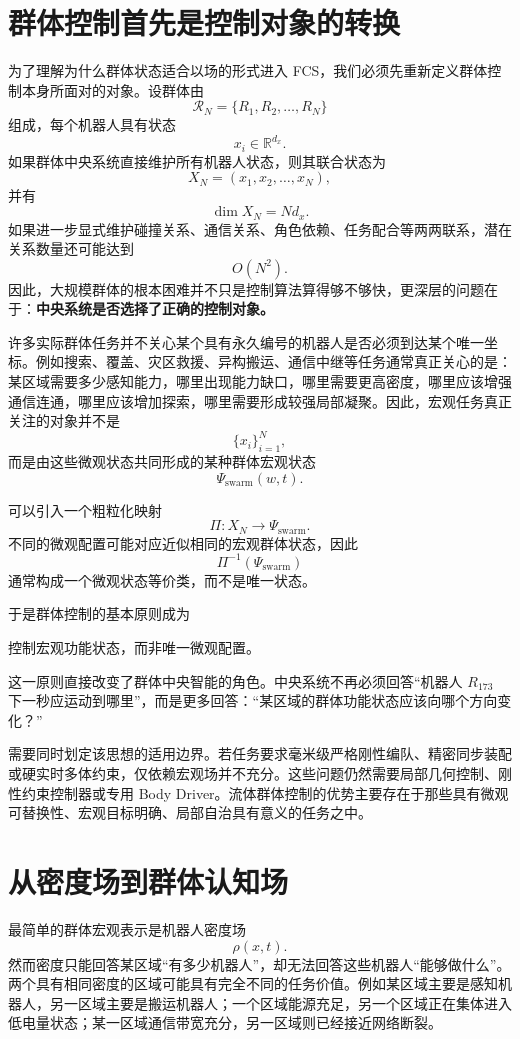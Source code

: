 \section{群体控制首先是控制对象的转换}

为了理解为什么群体状态适合以场的形式进入 FCS，我们必须先重新定义群体控制本身所面对的对象。设群体由
\[
\mathcal R_N
=
\{R_1,R_2,\ldots,R_N\}
\]
组成，每个机器人具有状态
\[
x_i\in\mathbb R^{d_x}.
\]
如果群体中央系统直接维护所有机器人状态，则其联合状态为
\[
X_N
=
(x_1,x_2,\ldots,x_N),
\]
并有
\[
\dim X_N
=
Nd_x.
\]
如果进一步显式维护碰撞关系、通信关系、角色依赖、任务配合等两两联系，潜在关系数量还可能达到
\[
O(N^2).
\]
因此，大规模群体的根本困难并不只是控制算法算得够不够快，更深层的问题在于：\textbf{中央系统是否选择了正确的控制对象。}

许多实际群体任务并不关心某个具有永久编号的机器人是否必须到达某个唯一坐标。例如搜索、覆盖、灾区救援、异构搬运、通信中继等任务通常真正关心的是：某区域需要多少感知能力，哪里出现能力缺口，哪里需要更高密度，哪里应该增强通信连通，哪里应该增加探索，哪里需要形成较强局部凝聚。因此，宏观任务真正关注的对象并不是
\[
\{x_i\}_{i=1}^{N},
\]
而是由这些微观状态共同形成的某种群体宏观状态
\[
\Psi_{\mathrm{swarm}}(w,t).
\]

可以引入一个粗粒化映射
\[
\Pi:
X_N
\rightarrow
\Psi_{\mathrm{swarm}}.
\]
不同的微观配置可能对应近似相同的宏观群体状态，因此
\[
\Pi^{-1}(\Psi_{\mathrm{swarm}})
\]
通常构成一个微观状态等价类，而不是唯一状态。

于是群体控制的基本原则成为
\begin{proposition*}
控制宏观功能状态，而非唯一微观配置。
\end{proposition*}
这一原则直接改变了群体中央智能的角色。中央系统不再必须回答“机器人 $R_{173}$ 下一秒应运动到哪里”，而是更多回答：“某区域的群体功能状态应该向哪个方向变化？”

需要同时划定该思想的适用边界。若任务要求毫米级严格刚性编队、精密同步装配或硬实时多体约束，仅依赖宏观场并不充分。这些问题仍然需要局部几何控制、刚性约束控制器或专用 Body Driver。流体群体控制的优势主要存在于那些具有微观可替换性、宏观目标明确、局部自治具有意义的任务之中。


\section{从密度场到群体认知场}

最简单的群体宏观表示是机器人密度场
\[
\rho(x,t).
\]
然而密度只能回答某区域“有多少机器人”，却无法回答这些机器人“能够做什么”。两个具有相同密度的区域可能具有完全不同的任务价值。例如某区域主要是感知机器人，另一区域主要是搬运机器人；一个区域能源充足，另一个区域正在集体进入低电量状态；某一区域通信带宽充分，另一区域则已经接近网络断裂。

